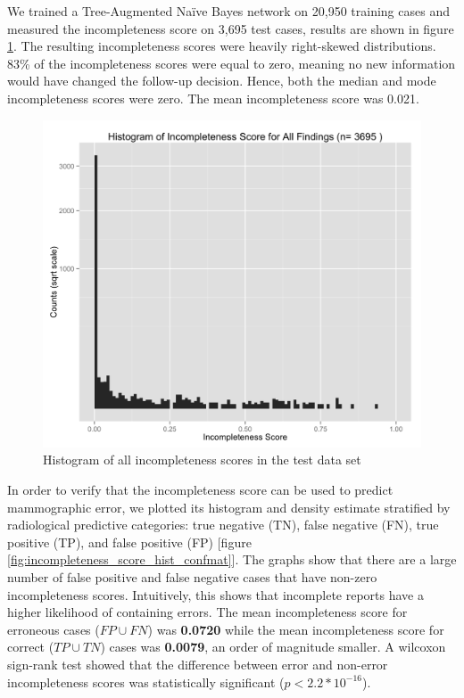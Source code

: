 We trained a Tree-Augmented Naïve Bayes network on 20,950 training cases and measured the incompleteness score on 3,695 test cases, results are shown in figure \ref{fig:incompleteness_score_hist_all}. The resulting incompleteness scores were heavily right-skewed distributions. 83\% of the incompleteness scores were equal to zero, meaning no new information would have changed the follow-up decision. Hence, both the median and mode incompleteness scores were zero. The mean incompleteness score was 0.021.

\begin{figure}[h!]
\centering
\includegraphics[width=\linewidth]{figures/incompleteness_score_hist_all}
\caption{Histogram of all incompleteness scores in the test data set}
\label{fig:incompleteness_score_hist_all}
\end{figure}


In order to verify that the incompleteness score can be used to predict mammographic error, we plotted its histogram and density estimate stratified by radiological predictive categories: true negative (TN), false negative (FN), true positive (TP), and false positive (FP) [figure \ref{fig:incompleteness_score_hist_confmat}]. The graphs show that there are a large number of false positive and false negative cases that have non-zero incompleteness scores. Intuitively, this shows that incomplete reports have a higher likelihood of containing errors. The mean incompleteness score for erroneous cases ($FP \cup FN$) was \textbf{0.0720} while the mean incompleteness score for correct ($TP \cup TN$) cases was \textbf{0.0079}, an order of magnitude smaller. A wilcoxon sign-rank test showed that the difference between error and non-error incompleteness scores was statistically significant ($p < 2.2*10^{-16}$).

